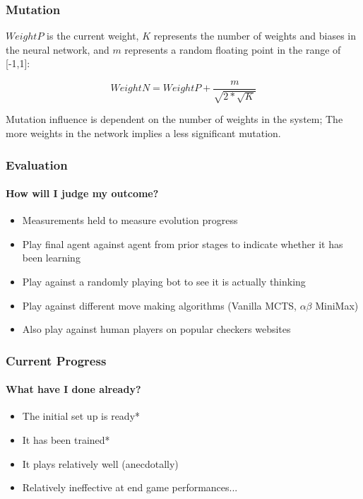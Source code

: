 \documentclass[aspectratio=169]{beamer}
\begin{document}
	\begin{frame}
		\frametitle{Mutation}
		$WeightP$ is the current weight, $K$ represents the number of weights and biases in the neural network, and $m$ represents a random floating point in the range of [-1,1]:

			$$ WeightN = WeightP + \frac{m}{\sqrt{2 * \sqrt{K} }}$$

		Mutation influence is dependent on the number of weights in the system; The more weights in the network implies a less significant mutation.
	\end{frame}


\begin{frame}
	\frametitle{Evaluation}
	\framesubtitle{How will I judge my outcome?}

	\begin{itemize}
		\item Measurements held to measure evolution progress
		\item Play final agent against agent from prior stages to indicate whether it has been learning
		\item Play against a randomly playing bot to see it is actually thinking
		\item Play against different move making algorithms (Vanilla MCTS, $\alpha \beta$ MiniMax)
		\item Also play against human players on popular checkers websites
	\end{itemize}
\end{frame}

\begin{frame}
	\frametitle{Current Progress}
	\framesubtitle{What have I done already?}

	\begin{itemize}
		\item The initial set up is ready*
		\item It has been trained*
		\item It plays relatively well (anecdotally)
		\item Relatively ineffective at end game performances...
	\end{itemize}
\end{frame}
\end{document}
